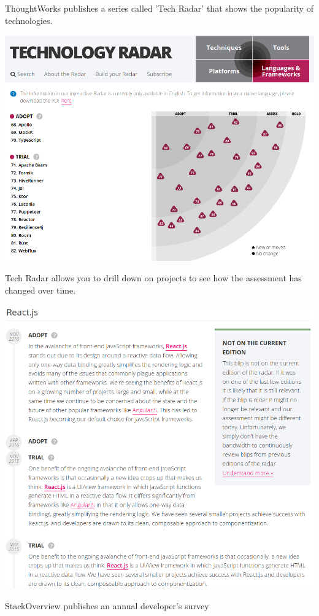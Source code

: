 ThoughtWorks publishes a series called 'Tech Radar' that shows the
popularity of technologies.

\includegraphics{images/organizational-project-skill-demand_tech-radar.png}

Tech Radar allows you to drill down on projects to see how the
assessment has changed over time.

\includegraphics{images/organizational-project-skill-demand_tech-react.png}

StackOverview publishes an annual developer's survey

